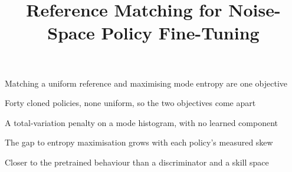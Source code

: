 \documentclass[preprint,12pt]{elsarticle}
\begin{document}
\begin{frontmatter}
\title{Reference Matching for Noise-Space Policy Fine-Tuning}
\begin{highlights}
\item Matching a uniform reference and maximising mode entropy are one objective
\item Forty cloned policies, none uniform, so the two objectives come apart
\item A total-variation penalty on a mode histogram, with no learned component
\item The gap to entropy maximisation grows with each policy's measured skew
\item Closer to the pretrained behaviour than a discriminator and a skill space
\end{highlights}
\end{frontmatter}
\end{document}
